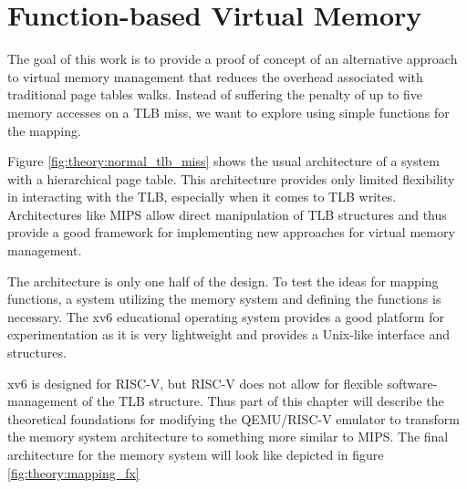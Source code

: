 


\section{Function-based Virtual Memory}


The goal of this work is to provide a proof of concept of an alternative approach
to virtual memory management that reduces the overhead associated with traditional page tables walks.
Instead of suffering the penalty of up to five memory accesses on a TLB miss,
we want to explore using simple functions for the mapping.

Figure \ref{fig:theory:normal_tlb_miss} shows the usual architecture of a system
with a hierarchical page table.
This architecture provides only limited flexibility in interacting with the TLB, especially when it comes to TLB writes.
Architectures like MIPS allow direct manipulation of TLB structures and thus provide a good framework for implementing new approaches for virtual memory management.

The architecture is only one half of the design. To test the ideas for mapping
functions, a system utilizing the memory system and defining the functions is necessary.
The xv6 educational operating system provides a good platform for experimentation as it is very lightweight and provides a Unix-like interface and structures.

xv6 is designed for RISC-V, but RISC-V does not allow for flexible software-management of the TLB structure.
Thus part of this chapter will describe the theoretical foundations for modifying
the QEMU/RISC-V emulator to transform the memory system architecture to something
more similar to MIPS.
The final architecture for the memory system will look like depicted in figure \ref{fig:theory:mapping_fx}

